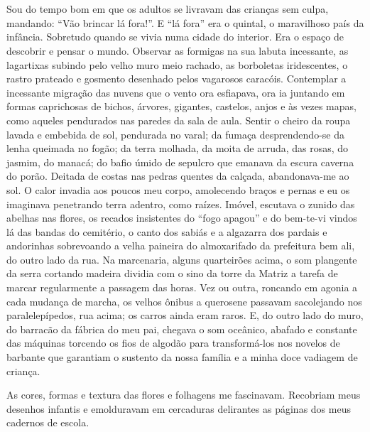 \chapter{}
Sou do tempo bom em que os adultos se livravam das crianças sem culpa, mandando: “Vão brincar lá fora!”.
E “lá fora” era o quintal, o maravilhoso país da infância.
Sobretudo quando se vivia numa cidade do interior. 
Era o espaço de descobrir e pensar o mundo. 
Observar as formigas na sua labuta incessante, as lagartixas subindo pelo velho muro meio rachado, as borboletas iridescentes, o rastro prateado e gosmento desenhado pelos vagarosos caracóis.   
Contemplar a incessante migração das nuvens que o vento ora esfiapava, ora ia juntando em formas caprichosas de bichos, árvores, gigantes, castelos, anjos e às vezes mapas, como aqueles pendurados nas paredes da sala de aula. 
Sentir o cheiro da roupa lavada e embebida de sol, pendurada no varal; da fumaça desprendendo-se da lenha queimada no fogão; da terra molhada, da moita de arruda, das rosas, do jasmim, do manacá; do bafio úmido de sepulcro que emanava da escura caverna do porão. 
Deitada de costas nas pedras quentes da calçada, abandonava-me ao sol. O calor invadia aos poucos meu corpo, amolecendo braços e pernas e eu os imaginava penetrando terra adentro, como raízes. 
Imóvel, escutava o zunido das abelhas nas flores, os recados insistentes do “fogo apagou” e do bem-te-vi vindos lá das bandas do cemitério, o canto dos sabiás e a algazarra dos pardais e andorinhas sobrevoando a velha paineira do almoxarifado da prefeitura bem ali, do outro lado da rua. 
Na marcenaria, alguns quarteirões acima, o som plangente da serra cortando madeira dividia com o sino da torre da Matriz a tarefa de marcar regularmente a passagem das horas. 
Vez ou outra, roncando em agonia a cada mudança de marcha, os velhos ônibus a querosene passavam sacolejando nos paralelepípedos, rua acima; os carros ainda eram raros. 
E, do outro lado do muro, do barracão da fábrica do meu pai, chegava o som oceânico, abafado e constante das máquinas torcendo os fios de algodão para transformá-los nos novelos de barbante que garantiam o sustento da nossa família e a minha doce vadiagem de criança.

As cores, formas e textura das flores e folhagens me fascinavam. 
Recobriam meus desenhos infantis e emolduravam em cercaduras delirantes as páginas dos meus cadernos de escola.


